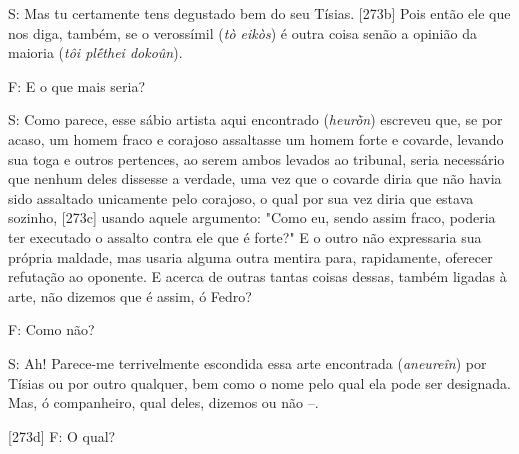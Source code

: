 S: Mas tu certamente tens degustado bem do seu Tísias. {[}273b{]} Pois
então ele que nos diga, também, se o verossímil (\emph{tò eikòs}) é
outra coisa senão a opinião da maioria (\emph{tôi plḗthei dokoûn}).

F: E o que mais seria?

S: Como parece, esse sábio artista aqui encontrado (\emph{heurṑn})
escreveu que, se por acaso, um homem fraco e corajoso assaltasse um
homem forte e covarde, levando sua toga e outros pertences, ao serem
ambos levados ao tribunal, seria necessário que nenhum deles dissesse a
verdade, uma vez que o covarde diria que não havia sido assaltado
unicamente pelo corajoso, o qual por sua vez diria que estava sozinho,
{[}273c{]} usando aquele argumento: "Como eu, sendo assim fraco, poderia
ter executado o assalto contra ele que é forte?" E o outro não
expressaria sua própria maldade, mas usaria alguma outra mentira para,
rapidamente, oferecer refutação ao oponente. E acerca de outras tantas
coisas dessas, também ligadas à arte, não dizemos que é assim, ó Fedro?

F: Como não?

S: Ah! Parece-me terrivelmente escondida essa arte encontrada
(\emph{aneureîn}) por Tísias ou por outro qualquer, bem como o nome pelo
qual ela pode ser designada. Mas, ó companheiro, qual deles, dizemos ou
não --.

{[}273d{]} F: O qual?

